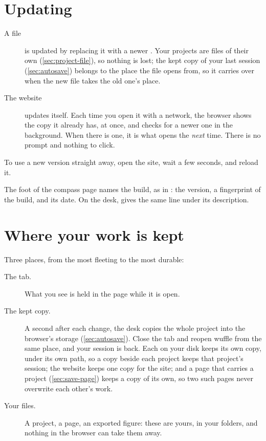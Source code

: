 \section{Updating}\label{sec:updating}

\begin{description}
\item[A file] is updated by replacing it with a newer . Your projects are files of
their own (\cref{sec:project-file}), so nothing is lost; the kept copy of your last session
(\cref{sec:autosave}) belongs to the place the file opens from, so it carries over when the new file
takes the old one's place.
\item[The website] updates itself. Each time you open it with a network, the browser shows the copy it
already has, at once, and checks for a newer one in the background. When there is one, it is what opens
the \emph{next} time. There is no prompt and nothing to click.
\end{description}

\begin{tip}
To use a new version straight away, open the site, wait a few seconds, and reload it.
\end{tip}

The foot of the compass page names the build, as in
: the version, a fingerprint of the build, and its date. On
the desk,  gives the same line under its description.

\section{Where your work is kept}\label{sec:where-kept}

Three places, from the most fleeting to the most durable:

\begin{description}
\item[The tab.] What you see is held in the page while it is open.
\item[The kept copy.] A second after each change, the desk copies the whole project into the browser's
storage (\cref{sec:autosave}). Close the tab and reopen wuffle from the same place, and your session is
back. Each  on your disk keeps its own copy, under its own path, so a copy beside each
project keeps that project's session; the website keeps one copy for the site; and a page that carries a
project (\cref{sec:save-page}) keeps a copy of its own, so two such pages never overwrite each other's
work.
\item[Your files.] A  project, a  page, an exported figure: these
are yours, in your folders, and nothing in the browser can take them away.
\end{description}

